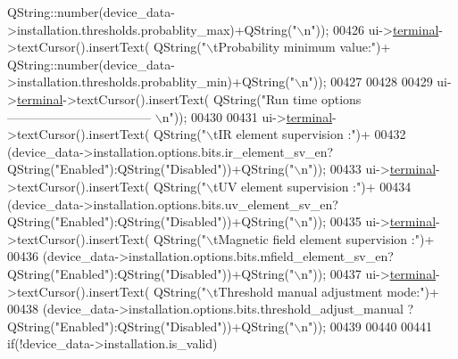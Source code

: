 \begin{DoxyCode}
      QString::number(device\_data->installation.thresholds.probablity\_max)+QString(\textcolor{stringliteral}{"\(\backslash\)n"}));
00426        ui->\hyperlink{a00027_aae71c46ea4546df5994735dee573b2dd}{terminal}->textCursor().insertText( QString(\textcolor{stringliteral}{"\(\backslash\)tProbability minimum value:"})+
      QString::number(device\_data->installation.thresholds.probablity\_min)+QString(\textcolor{stringliteral}{"\(\backslash\)n"}));
00427 
00428 
00429        ui->\hyperlink{a00027_aae71c46ea4546df5994735dee573b2dd}{terminal}->textCursor().insertText( QString(\textcolor{stringliteral}{"Run time options 
       ----------------------------------- \(\backslash\)n"}));
00430 
00431        ui->\hyperlink{a00027_aae71c46ea4546df5994735dee573b2dd}{terminal}->textCursor().insertText( QString(\textcolor{stringliteral}{"\(\backslash\)tIR element supervision :"})+
00432                                             (device\_data->installation.options.bits.ir\_element\_sv\_en?
      QString(\textcolor{stringliteral}{"Enabled"}):QString(\textcolor{stringliteral}{"Disabled"}))+QString(\textcolor{stringliteral}{"\(\backslash\)n"}));
00433        ui->\hyperlink{a00027_aae71c46ea4546df5994735dee573b2dd}{terminal}->textCursor().insertText( QString(\textcolor{stringliteral}{"\(\backslash\)tUV element supervision :"})+
00434                                             (device\_data->installation.options.bits.uv\_element\_sv\_en?
      QString(\textcolor{stringliteral}{"Enabled"}):QString(\textcolor{stringliteral}{"Disabled"}))+QString(\textcolor{stringliteral}{"\(\backslash\)n"}));
00435        ui->\hyperlink{a00027_aae71c46ea4546df5994735dee573b2dd}{terminal}->textCursor().insertText( QString(\textcolor{stringliteral}{"\(\backslash\)tMagnetic field element supervision :"})+
00436                                             (device\_data->installation.options.bits.mfield\_element\_sv\_en?
      QString(\textcolor{stringliteral}{"Enabled"}):QString(\textcolor{stringliteral}{"Disabled"}))+QString(\textcolor{stringliteral}{"\(\backslash\)n"}));
00437        ui->\hyperlink{a00027_aae71c46ea4546df5994735dee573b2dd}{terminal}->textCursor().insertText( QString(\textcolor{stringliteral}{"\(\backslash\)tThreshold manual adjustment mode:"})+
00438                                             (device\_data->installation.options.bits.threshold\_adjust\_manual
      ?QString(\textcolor{stringliteral}{"Enabled"}):QString(\textcolor{stringliteral}{"Disabled"}))+QString(\textcolor{stringliteral}{"\(\backslash\)n"}));
00439 
00440 
00441        \textcolor{keywordflow}{if}(!device\_data->installation.is\_valid)

\end{DoxyCode}
